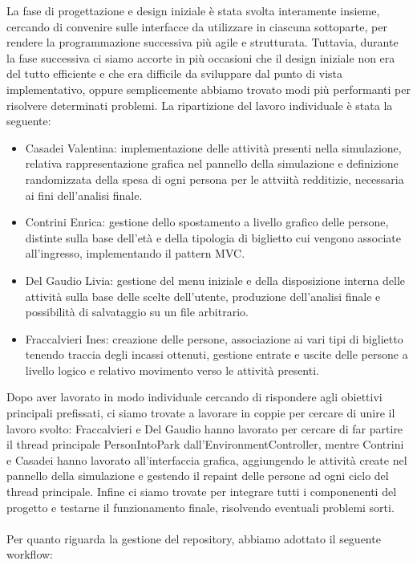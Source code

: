 \documentclass[a4paper,12pt]{report}
\begin{document}
La fase di progettazione e design iniziale è stata svolta interamente insieme, cercando di convenire sulle interfacce da utilizzare in ciascuna sottoparte, per rendere la programmazione successiva più agile e strutturata. Tuttavia, durante la fase successiva ci siamo accorte in più occasioni che il design iniziale non era del tutto efficiente e che era difficile da sviluppare dal punto di vista implementativo, oppure semplicemente abbiamo trovato modi più performanti per risolvere determinati problemi.
La ripartizione del lavoro individuale è stata la seguente:

\begin{itemize}
	\item Casadei Valentina: implementazione delle attività presenti nella simulazione, relativa rappresentazione grafica nel pannello della simulazione e definizione randomizzata della spesa di ogni persona per le attviità redditizie, necessaria ai fini dell'analisi finale.
	\item Contrini Enrica: gestione dello spostamento a livello grafico delle persone, distinte sulla base dell'età e della tipologia di biglietto cui vengono associate all'ingresso, implementando il pattern MVC.
	\item Del Gaudio Livia: gestione del menu iniziale e della disposizione interna delle attività sulla base delle scelte dell'utente, produzione dell'analisi finale e possibilità di salvataggio su un file arbitrario.
	\item Fraccalvieri Ines: creazione delle persone, associazione ai vari tipi di biglietto tenendo traccia degli incassi ottenuti, gestione entrate e uscite delle persone a livello logico e relativo movimento verso le attività presenti.
\end{itemize}

Dopo aver lavorato in modo individuale cercando di rispondere agli obiettivi principali prefissati, ci siamo trovate a lavorare in coppie per cercare di unire il lavoro svolto: Fraccalvieri e Del Gaudio hanno lavorato per cercare di far partire il thread principale PersonIntoPark dall'EnvironmentController, mentre Contrini e Casadei hanno lavorato all'interfaccia grafica, aggiungendo le attività create nel pannello della simulazione e gestendo il repaint delle persone ad ogni ciclo del thread principale. Infine ci siamo trovate per integrare tutti i componenenti del progetto e testarne il funzionamento finale, risolvendo eventuali problemi sorti.

\paragraph{}Per quanto riguarda la gestione del repository, abbiamo adottato il seguente workflow:
\end{document}
